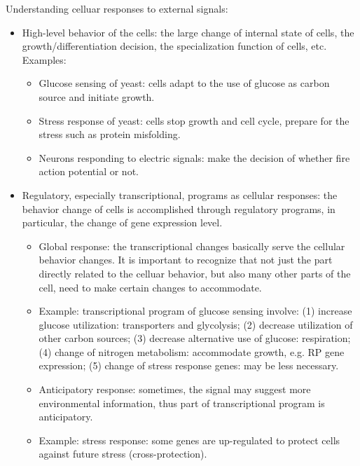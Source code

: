 \documentclass{report}
\begin{document}
Understanding celluar responses to external signals: 
\begin{itemize}
\item High-level behavior of the cells: the large change of internal state of cells, the growth/differentiation decision, the specialization function of cells, etc. Examples:
\begin{itemize}
	\item Glucose sensing of yeast: cells adapt to the use of glucose as carbon source and initiate growth. 
	\item Stress response of yeast: cells stop growth and cell cycle, prepare for the stress such as protein misfolding. 
	\item Neurons responding to electric signals: make the decision of whether fire action potential or not. 
\end{itemize}

\item Regulatory, especially transcriptional, programs as cellular responses: the behavior change of cells is accomplished through regulatory programs, in particular, the change of gene expression level. 
\begin{itemize}
	\item Global response: the transcriptional changes basically serve the cellular behavior changes. It is important to recognize that not just the part directly related to the celluar behavior, but also many other parts of the cell, need to make certain changes to accommodate. 
	\item Example: transcriptional program of glucose sensing involve: (1) increase glucose utilization: transporters and glycolysis; (2) decrease utilization of other carbon sources; (3) decrease alternative use of glucose: respiration; (4) change of nitrogen metabolism: accommodate growth, e.g. RP gene expression; (5) change of stress response genes: may be less necessary. 
	\item Anticipatory response: sometimes, the signal may suggest more environmental information, thus part of transcriptional program is anticipatory. 
	\item Example: stress response: some genes are up-regulated to protect cells against future stress (cross-protection). 
\end{itemize}


\end{itemize}
\end{document}
